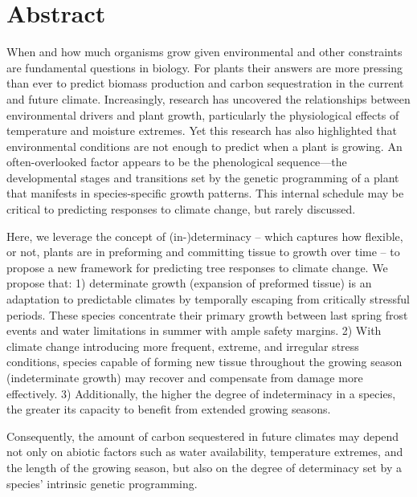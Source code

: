 \documentclass{article}
\begin{document}
\section*{Abstract} %
	When and how much organisms grow given environmental and other constraints are fundamental questions in biology. For plants their answers are more pressing than ever to predict biomass production and carbon sequestration in the current and future climate. Increasingly, research has uncovered the relationships between environmental drivers and plant growth, particularly the physiological effects of temperature and moisture extremes. Yet this research has also highlighted that environmental conditions are not enough to predict when a plant is growing. An often-overlooked factor appears to be the phenological sequence---the developmental stages and transitions set by the genetic programming of a plant that manifests in species-specific growth patterns. This internal schedule may be critical to predicting responses to climate change, but rarely discussed. 
	
	Here, we leverage the concept of (in-)determinacy -- which captures how flexible, or not, plants are in preforming and committing tissue to growth over time -- to propose a new framework for predicting tree responses to climate change. We propose that: 1) determinate growth (expansion of preformed tissue) is an adaptation to predictable climates by temporally escaping from critically stressful periods. These species concentrate their primary growth between last spring frost events and water limitations in summer with ample safety margins. 2) With climate change introducing more frequent, extreme, and irregular stress conditions, species capable of forming new tissue throughout the growing season (indeterminate growth) may recover and compensate from damage more effectively. 3) Additionally, the higher the degree of indeterminacy in a species, the greater its capacity to benefit from extended growing seasons. 
	
	Consequently, the amount of carbon sequestered in future climates may depend not only on abiotic factors such as water availability, temperature extremes, and the length of the growing season, but also on the degree of determinacy set by a species' intrinsic genetic programming.\\
		
\end{document}
